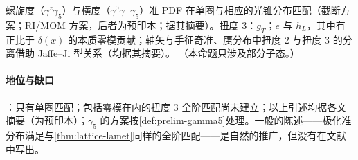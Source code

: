 \begin{proposition}\label{prop:lamet-polarized}
螺旋度（$\gamma^z\gamma_5$）与横度（$\gamma^0\gamma^\perp\gamma_5$）准 PDF 在单圈与相应的光锥分布匹配（截断方案\cite{XiongEtAl2014}；RI/MOM 方案\cite{Lin:2018pvv,Liu:2018hxv}，后者为预印本；据其摘要）。扭度 3：$g_T$\cite{Bhattacharya:2020xlt}；$e$ 与 $h_L$，其中有正比于 $\delta(x)$ 的本质零模贡献\cite{Bhattacharya:2020jfj}；轴矢\cite{Braun:2021aon}与手征奇\cite{Braun:2021gvv}准、赝分布中扭度 2 与扭度 3 的分离借助 Jaffe--Ji 型关系（均据其摘要）。
（本命题只涉及部分子态。）
\end{proposition}

\paragraph{地位与缺口}
\tagP：只有单圈匹配；包括零模在内的扭度 3 全阶匹配尚未建立；以上引述均据各文摘要（\cite{Liu:2018hxv}为预印本）；$\gamma_5$ 的方案按\cref{def:prelim-gamma5}处理。一般的陈述——极化准分布满足与\cref{thm:lattice-lamet}同样的全阶匹配——是自然的推广，但没有在文献中写出。
